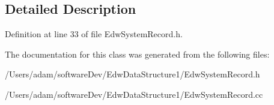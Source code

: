 \subsection{Detailed Description}


Definition at line 33 of file EdwSystemRecord.h.



The documentation for this class was generated from the following files:\begin{DoxyCompactItemize}
\item 
/Users/adam/softwareDev/EdwDataStructure1/EdwSystemRecord.h\item 
/Users/adam/softwareDev/EdwDataStructure1/EdwSystemRecord.cc\end{DoxyCompactItemize}
